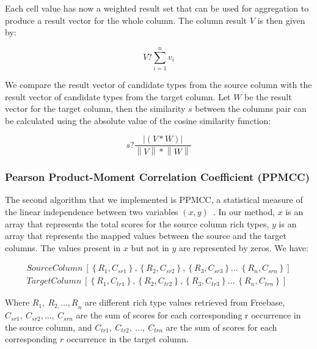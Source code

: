 Each cell value has now a weighted result set that can be used for aggregation to produce a result vector for the whole column. The column result $V$ is then given by:

\begin{equation}\label{equation:equation_4}
V?\sum^n_{i=1}{v_i}
\end{equation}

We compare the result vector of candidate types from the source column with the result vector of candidate types from the target column. Let $W$ be the result vector for the target column, then the similarity $s$ between the columns pair can be calculated using the absolute value of the cosine similarity function:

\begin{equation}\label{equation:equation_5}
s?\frac{\left|(V*W)\right|}{\left\|V\right\|*\left\|W\right\|}
\end{equation}


\subsubsection{Pearson Product-Moment Correlation Coefficient (PPMCC)}

The second algorithm that we implemented is PPMCC, a statistical measure of the linear independence between two variables $\left(x,y\right)$~\cite{Kowalski:RoyalStat:72}. In our method, $x$ is an array that represents the total scores for the source column rich types, $y$ is an array that represents the mapped values between the source and the target columns. The values present in $x$ but not in $y$ are represented by zeros. We have:


\begin{equation}\label{equation:equation_6}
\begin{split}
SourceColumn\ \left[\left\{R_1,C_{sr1}\right\},\left\{R_2,C_{sr2}\right\},\left\{R_3,C_{sr3}\right\}\dots \ \left\{R_n,C_{srn}\right\}\right] \\
TargetColumn\ \left[\left\{R_1,C_{tr1}\right\},\left\{R_2,C_{tr2}\right\},\left\{R_3,C_{tr3}\right\}\dots \ \left\{R_n,C_{trn}\right\}\right]
\end{split}
\end{equation}

Where $R_1,\ R_{2,}{\dots ,R}_n$ are different rich type values retrieved from Freebase, $C_{sr1},\ C_{sr2},\dots ,\ C_{srn}$ are the sum of scores for each corresponding r occurrence in the source column, and $C_{tr1},\ C_{tr2},\ \dots ,\ C_{trn}$ are the sum of scores for each corresponding $r$ occurrence in the target column.

